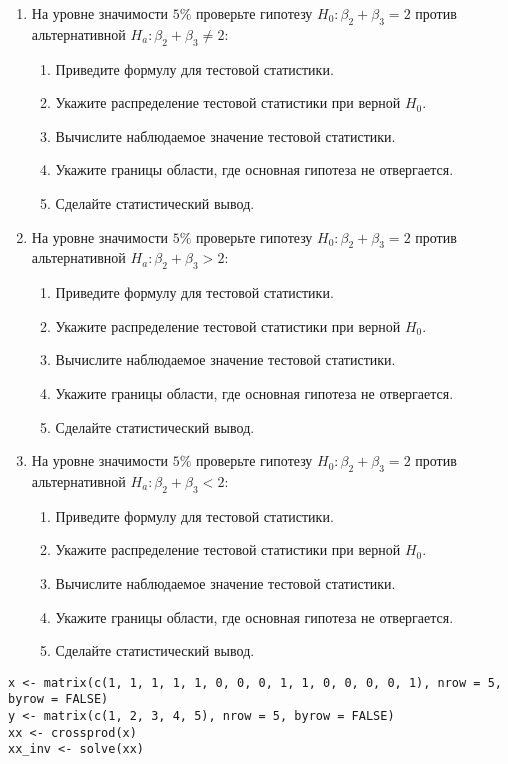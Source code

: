 \begin{problem}
\begin{enumerate}
\item На уровне значимости $5\%$ проверьте гипотезу  $H_0: \beta_2 + \beta_3 = 2$ против альтернативной $H_a: \beta_2 + \beta_3 \not= 2$:
\begin{enumerate}
\item Приведите формулу для тестовой статистики.
\item Укажите распределение тестовой статистики при верной $H_0$.
\item Вычислите наблюдаемое значение тестовой статистики.
\item Укажите границы области, где основная гипотеза не отвергается.
\item Сделайте статистический вывод.
\end{enumerate}
\item На уровне значимости $5\%$ проверьте гипотезу  $H_0: \beta_2 + \beta_3 = 2$ против альтернативной $H_a: \beta_2 + \beta_3 > 2$:
\begin{enumerate}
\item Приведите формулу для тестовой статистики.
\item Укажите распределение тестовой статистики при верной $H_0$.
\item Вычислите наблюдаемое значение тестовой статистики.
\item Укажите границы области, где основная гипотеза не отвергается.
\item Сделайте статистический вывод.
\end{enumerate}
\item На уровне значимости $5\%$ проверьте гипотезу  $H_0: \beta_2 + \beta_3 = 2$ против альтернативной $H_a: \beta_2 + \beta_3 < 2$:
\begin{enumerate}
\item Приведите формулу для тестовой статистики.
\item Укажите распределение тестовой статистики при верной $H_0$.
\item Вычислите наблюдаемое значение тестовой статистики.
\item Укажите границы области, где основная гипотеза не отвергается.
\item Сделайте статистический вывод.
\end{enumerate}
\end{enumerate}


\begin{sol}

\begin{verbatim}
x <- matrix(c(1, 1, 1, 1, 1, 0, 0, 0, 1, 1, 0, 0, 0, 0, 1), nrow = 5, byrow = FALSE)
y <- matrix(c(1, 2, 3, 4, 5), nrow = 5, byrow = FALSE)
xx <- crossprod(x)
xx_inv <- solve(xx)
\end{verbatim}




\end{sol}
\end{problem}
